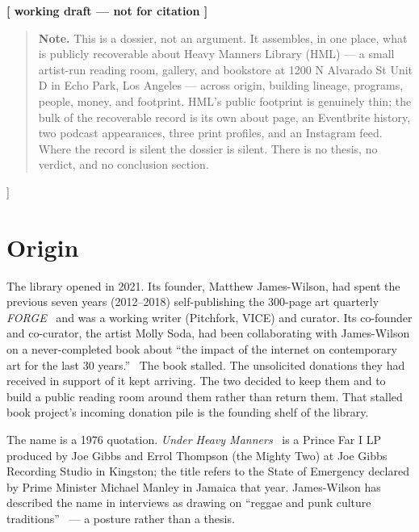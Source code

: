 \documentclass[10pt,letterpaper,twocolumn]{article}
\begin{document}
{\begin{center}
{\small\color{acpink}\textbf{[ working draft --- not for citation ]}}
\end{center}
\vspace{0.3em}

\begin{quote}
\small\noindent\textbf{Note.} This is a dossier, not an argument. It assembles, in one place, what is publicly recoverable about Heavy Manners Library (HML) --- a small artist-run reading room, gallery, and bookstore at 1200 N Alvarado St Unit D in Echo Park, Los Angeles --- across origin, building lineage, programs, people, money, and footprint. HML's public footprint is genuinely thin; the bulk of the recoverable record is its own about page, an Eventbrite history, two podcast appearances, three print profiles, and an Instagram feed. Where the record is silent the dossier is silent. There is no thesis, no verdict, and no conclusion section.
\end{quote}
\vspace{0.5em}
}]

\section{Origin}

The library opened in 2021. Its founder, Matthew James-Wilson, had spent the previous seven years (2012--2018) self-publishing the 300-page art quarterly \emph{FORGE}~\citep{hyperallergic2024indie} and was a working writer (Pitchfork, VICE) and curator. Its co-founder and co-curator, the artist Molly Soda, had been collaborating with James-Wilson on a never-completed book about ``the impact of the internet on contemporary art for the last 30 years.''~\citep{sjsuischool, flipboardpodcast} The book stalled. The unsolicited donations they had received in support of it kept arriving. The two decided to keep them and to build a public reading room around them rather than return them. That stalled book project's incoming donation pile is the founding shelf of the library.

The name is a 1976 quotation. \emph{Under Heavy Manners}~\citep{wikipediaprincefari} is a Prince Far I LP produced by Joe Gibbs and Errol Thompson (the Mighty Two) at Joe Gibbs Recording Studio in Kingston; the title refers to the State of Emergency declared by Prime Minister Michael Manley in Jamaica that year. James-Wilson has described the name in interviews as drawing on ``reggae and punk culture traditions''~\citep{flipboardpodcast} --- a posture rather than a thesis.
\end{document}
